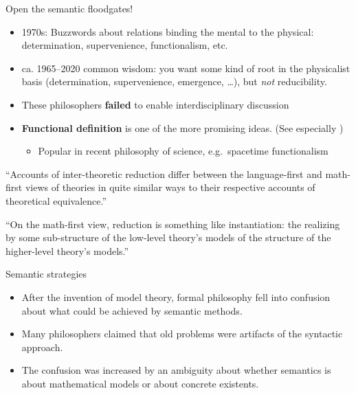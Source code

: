 \documentclass[fleqn]{beamer}
\begin{document}
\begin{frame}{Open the semantic floodgates!}


  \begin{itemize}
  \item 1970s: Buzzwords about relations binding the mental to the
    physical: determination, supervenience, functionalism, etc.
  \item ca.  1965--2020 common wisdom: you want some kind of root in
    the physicalist basis (determination, supervenience, emergence,
    \dots ), but \emph{not} reducibility.
  \item These philosophers \textbf{failed} to enable interdisciplinary
    discussion
  \item \textbf{Functional definition} is one of the more promising
    ideas. (See especially \cite{lewis1970,lewis1972})
    \begin{itemize}
    \item Popular in recent philosophy of science, e.g.\ spacetime
      functionalism \citep[see][]{butterfield2023}
    \end{itemize}
  \end{itemize}


\end{frame}

\begin{frame}

  ``Accounts of inter-theoretic reduction differ between the
  language-first and math-first views of theories in quite similar
  ways to their respective accounts of theoretical equivalence.''
  \citep[p 356]{lang}

  ``On the math-first view, reduction is something like instantiation:
  the realizing by some sub-structure of the low-level theory's models
  of the structure of the higher-level theory's models.'' \citep[p
  357]{lang}

\end{frame}  

\begin{frame}{Semantic strategies}

  \begin{itemize}
  \item After the invention of model theory, formal philosophy fell
    into confusion about what could be achieved by semantic methods.
  \item Many philosophers claimed that old problems were artifacts of
    the syntactic approach.
  \item The confusion was increased by an ambiguity about whether
    semantics is about mathematical models or about concrete
    existents.
  \end{itemize}

\end{frame}
\end{document}
